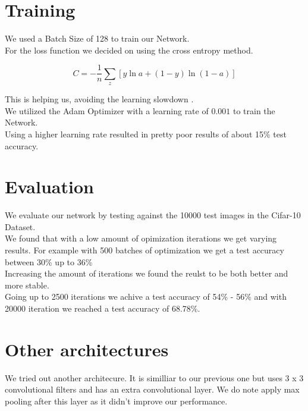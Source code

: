 \documentclass[twoside, twocolumn]{article}
\begin{document}

\section{Training}

We used a Batch Size of 128 to train our Network. \\
For the loss function we decided on using the cross entropy method.

\begin{equation}
 C = - \dfrac{1}{n} \sum_{z} [y \ln a + (1 - y) \ln (1 - a)]
\end{equation}

This is helping us, avoiding the learning slowdown \cite{crossentro}.\\
We utilized the Adam Optimizer with a learning rate of $0.001$ to train the Network. \\
Using a higher learning rate resulted in pretty poor results of about 15\% test accuracy.


\section{Evaluation}
We evaluate our network by testing against the 10000 test images in the Cifar-10 Dataset. \\
We found that with a low amount of opimization iterations we get varying results. For example with 500 batches of optimization we get a test accuracy between 30\% up to 36\% \\
Increasing the amount of iterations we found the reulst to be both better and more stable. \\
Going up to 2500 iterations we achive a test accuracy of 54\% - 56\% and with 20000 iteration we reached a test accuracy of 68.78\%.




\section{Other architectures}
We tried out another architecure. It is similliar to our previous one but uses 3 x 3 convolutional filters and has an extra convolutional layer. We do note apply max pooling after this layer as it didn't improve our performance. \\
\end{document}
